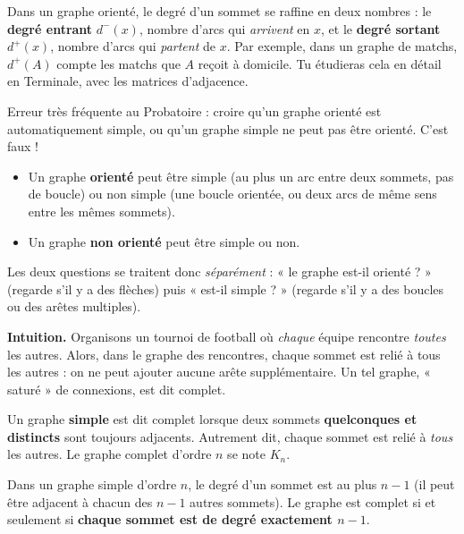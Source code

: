 \documentclass[11pt]{article}
\newcommand{\cle}[1]{{\popxbold\color{popdark}#1}}
\newcounter{popsec}
\newcounter{popsub}
\newcommand{\courssub}[1]{%
  \stepcounter{popsub}%
  \par\vspace{9pt}\noindent{\popxbold\fontsize{11.5}{13}\selectfont\color{popink}{\color{poporange}\thepopsec.\thepopsub}\hspace{6pt}#1}\par\nopagebreak\vspace{4pt}
}
\begin{document}
\begin{savaistu}
Dans un graphe orienté, le degré d'un sommet se raffine en deux nombres : le \textbf{degré entrant} $d^{-}(x)$, nombre d'arcs qui \emph{arrivent} en $x$, et le \textbf{degré sortant} $d^{+}(x)$, nombre d'arcs qui \emph{partent} de $x$. Par exemple, dans un graphe de matchs, $d^{+}(A)$ compte les matchs que $A$ reçoit à domicile. Tu étudieras cela en détail en Terminale, avec les matrices d'adjacence.
\end{savaistu}

\begin{attention}
Erreur très fréquente au Probatoire : croire qu'un graphe orienté est automatiquement simple, ou qu'un graphe simple ne peut pas être orienté. C'est faux !
\begin{itemize}
\item Un graphe \textbf{orienté} peut être simple (au plus un arc entre deux sommets, pas de boucle) ou non simple (une boucle orientée, ou deux arcs de même sens entre les mêmes sommets).
\item Un graphe \textbf{non orienté} peut être simple ou non.
\end{itemize}
Les deux questions se traitent donc \emph{séparément} : « le graphe est-il orienté ? » (regarde s'il y a des flèches) puis « est-il simple ? » (regarde s'il y a des boucles ou des arêtes multiples).
\end{attention}

\courssub{Graphes complets}

\textbf{Intuition.} Organisons un tournoi de football où \emph{chaque} équipe rencontre \emph{toutes} les autres. Alors, dans le graphe des rencontres, chaque sommet est relié à tous les autres : on ne peut ajouter aucune arête supplémentaire. Un tel graphe, « saturé » de connexions, est dit complet.

\begin{definition}
Un graphe \textbf{simple} est dit \cle{complet} lorsque deux sommets \textbf{quelconques et distincts} sont toujours adjacents. Autrement dit, chaque sommet est relié à \emph{tous} les autres. Le graphe complet d'ordre $n$ se note \cle{$K_n$}.
\end{definition}

\begin{aretenir}
Dans un graphe simple d'ordre $n$, le degré d'un sommet est au plus $n-1$ (il peut être adjacent à chacun des $n-1$ autres sommets). Le graphe est complet si et seulement si \textbf{chaque sommet est de degré exactement $n-1$}.
\end{aretenir}
\end{document}
